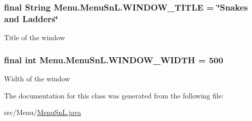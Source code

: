 \subsubsection[{W\+I\+N\+D\+O\+W\+\_\+\+T\+I\+T\+L\+E}]{\setlength{\rightskip}{0pt plus 5cm}final String Menu.\+Menu\+Sn\+L.\+W\+I\+N\+D\+O\+W\+\_\+\+T\+I\+T\+L\+E = \char`\"{}Snakes and Ladders\char`\"{}\hspace{0.3cm}{\ttfamily [private]}}\label{class_menu_1_1_menu_sn_l_a62bbb19bbedcdf63b575b4ae1048c343}
Title of the window \hypertarget{class_menu_1_1_menu_sn_l_a2fcacd6fe04ce3a540d0d100ca57b993}{}
\subsubsection[{W\+I\+N\+D\+O\+W\+\_\+\+W\+I\+D\+T\+H}]{\setlength{\rightskip}{0pt plus 5cm}final int Menu.\+Menu\+Sn\+L.\+W\+I\+N\+D\+O\+W\+\_\+\+W\+I\+D\+T\+H = 500\hspace{0.3cm}{\ttfamily [private]}}\label{class_menu_1_1_menu_sn_l_a2fcacd6fe04ce3a540d0d100ca57b993}
Width of the window 

The documentation for this class was generated from the following file\+:\begin{DoxyCompactItemize}
\item 
src/\+Menu/\hyperlink{_menu_sn_l_8java}{Menu\+Sn\+L.\+java}\end{DoxyCompactItemize}

